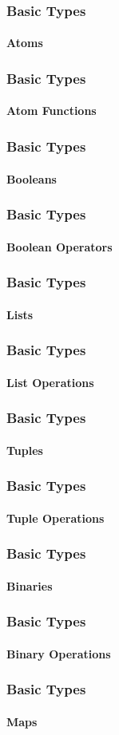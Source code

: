 \documentclass[english]{beamer}
\begin{document}
\begin{frame}[fragile]
\frametitle{Basic Types}
\framesubtitle{Atoms}

\end{frame}

\begin{frame}[fragile]
\frametitle{Basic Types}
\framesubtitle{Atom Functions}

\end{frame}

\begin{frame}[fragile]
\frametitle{Basic Types}
\framesubtitle{Booleans}

\end{frame}

\begin{frame}[fragile]
\frametitle{Basic Types}
\framesubtitle{Boolean Operators}

\end{frame}

\begin{frame}[fragile]
\frametitle{Basic Types}
\framesubtitle{Lists}

\end{frame}

\begin{frame}[fragile]
\frametitle{Basic Types}
\framesubtitle{List Operations}

\end{frame}

\begin{frame}[fragile]
\frametitle{Basic Types}
\framesubtitle{Tuples}

\end{frame}

\begin{frame}[fragile]
\frametitle{Basic Types}
\framesubtitle{Tuple Operations}

\end{frame}

\begin{frame}[fragile]
\frametitle{Basic Types}
\framesubtitle{Binaries}

\end{frame}

\begin{frame}[fragile]
\frametitle{Basic Types}
\framesubtitle{Binary Operations}

\end{frame}

\begin{frame}[fragile]
\frametitle{Basic Types}
\framesubtitle{Maps}

\end{frame}
\end{document}
